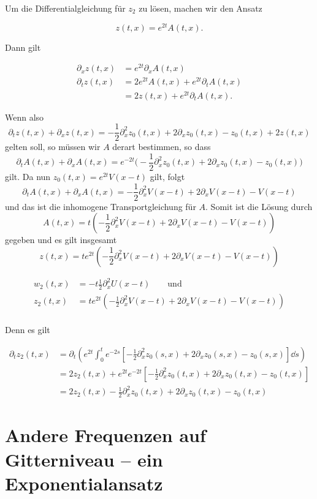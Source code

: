 Um die Differentialgleichung für $z_2$ zu lösen, machen wir den Ansatz

\[ z(t,x) = e^{2t} A(t,x). \]

Dann gilt

\begin{align*}
\partial_x z(t,x) &= e^{2t} \partial_x A(t,x)\\
\partial_t z(t,x) &= 2 e^{2t} A(t,x) + e^{2t} \partial_t A(t, x)\\
                  &= 2 z(t, x) + e^{2t} \partial_t A(t, x).
\end{align*}

Wenn also
\[ \partial_t z(t, x) + \partial_x z(t, x) = - \frac{1}{2} \partial^2_x z_0(t, x) + 2 \partial_x z_0(t, x) - z_0(t, x) + 2 z(t, x) \]
gelten soll, so müssen wir $A$ derart bestimmen, so dass
\[ \partial_t A(t, x) + \partial_x A(t,x) = e^{-2t} \bigl( - \frac{1}{2} \partial^2_x z_0(t, x) + 2 \partial_x z_0(t, x) - z_0(t, x) \bigr) \]
gilt. Da nun $z_0(t,x) = e^{2t} V(x - t)$ gilt, folgt
\[ \partial_t A(t, x) + \partial_x A(t,x) = - \frac{1}{2} \partial^2_x V(x - t) + 2 \partial_x V(x - t) - V(x - t) \]
und das ist die inhomogene Transportgleichung für $A$. Somit ist die Lösung durch
\[ A(t,x) = t \left( - \frac{1}{2} \partial^2_x V(x - t) + 2 \partial_x V(x - t) - V(x - t) \right) \]
gegeben und es gilt insgesamt
\[ z(t,x) = t e^{2t} \left( - \frac{1}{2} \partial^2_x V(x - t) + 2 \partial_x V(x - t) - V(x - t) \right) \]

\begin{align*}
w_2(t,x) &= - t \frac{1}{2} \partial^2_x U(x - t) \qquad \text{und}\\
z_2(t,x) &= t e^{2t} \left( - \frac{1}{2} \partial^2_x V(x - t) + 2 \partial_x V(x - t) - V(x - t) \right)\\
\end{align*}

Denn es gilt 

\begin{align*}
\partial_t z_2(t,x) &= \partial_t \left( e^{2t} \int_0^t e^{-2s} \left[ - \frac{1}{2} \partial^2_x z_0(s, x) + 2 \partial_x z_0(s, x) - z_0(s,x) \right] \dd s \right)\\
&= 2 z_2(t,x) + e^{2t} e^{-2t} \left[ - \frac{1}{2} \partial^2_x z_0(t, x) + 2 \partial_x z_0(t, x) - z_0(t,x) \right]\\
&= 2 z_2(t,x) - \frac{1}{2} \partial^2_x z_0(t, x) + 2 \partial_x z_0(t, x) - z_0(t,x)
\end{align*}

\section{Andere Frequenzen auf Gitterniveau -- ein Exponentialansatz}